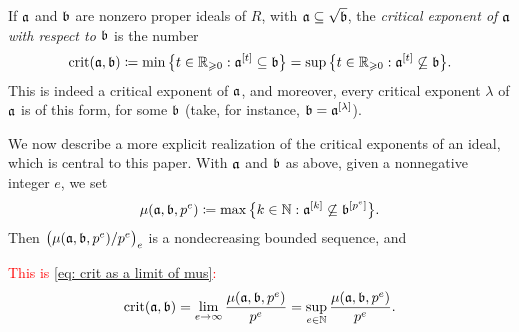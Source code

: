 \documentclass[11pt]{amsart}
\begin{document}
{If $\mathfrak{a}$ and $\mathfrak{b}$ are nonzero proper ideals of $R$, with $\mathfrak{a} \subseteq \sqrt{\mathfrak{b}}$, the \emph{critical exponent of $\mathfrak{a}$ with respect to $\mathfrak{b}$} is the number
\begin{equation}\label{eq: defn of crit(a,b)}
   \operatorname{crit}(\mathfrak{a},\mathfrak{b}) \coloneqq \min\big\{t\in \mathbb{R}_{\geqslant 0}: \mathfrak{a}^{[t]} \subseteq \mathfrak{b}\big\}
      = \sup\big\{t\in \mathbb{R}_{\geqslant 0}: \mathfrak{a}^{[t]} \not\subseteq \mathfrak{b}\big\}.
\end{equation}
This is indeed a critical exponent of $\mathfrak{a}$, and moreover, every critical exponent $\lambda$ of $\mathfrak{a}$ is of this form, for some $\mathfrak{b}$ (take, for instance, $\mathfrak{b} = \mathfrak{a}^{[\lambda]}$).

We now describe a more explicit realization of the critical exponents of an ideal, which is central to this paper.
With $\mathfrak{a}$ and $\mathfrak{b}$ as above, given a nonnegative integer $e$, we set
\[\mu(\mathfrak{a},\mathfrak{b},p^e) \coloneqq \max\big\{k\in \mathbb{N} : \mathfrak{a}^{[k]} \not\subseteq \mathfrak{b}^{[p^e]}\big\}.\]
Then $\big(\mu(\mathfrak{a},\mathfrak{b},p^e)/p^e\big)_e$ is a nondecreasing bounded sequence, and

\textcolor{red}{This is \ref{eq: crit as a limit of mus}: 
}
\begin{equation}
   \operatorname{crit}(\mathfrak{a},\mathfrak{b}) = \lim_{e\to \infty} \frac{\mu(\mathfrak{a},\mathfrak{b},p^e)}{p^e} = \sup_{e\in \mathbb{N}} \frac{\mu(\mathfrak{a},\mathfrak{b},p^e)}{p^e}.
\end{equation}



}
\end{document}
